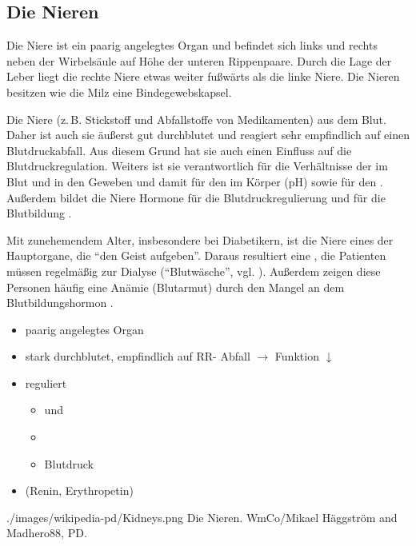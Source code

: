 \subsection{Die Nieren}


{%
Die Niere ist ein paarig angelegtes Organ und befindet sich
links und rechts neben der Wirbelsäule auf Höhe der unteren
Rippenpaare. Durch die Lage der Leber liegt die rechte Niere
etwas weiter fußwärts als die linke Niere. Die Nieren
besitzen wie die Milz eine Bindegewebskapsel.

Die Niere 
(z.\,B. Stickstoff und Abfallstoffe von Medikamenten) aus
dem Blut. Daher ist auch sie äußerst gut durchblutet und
reagiert sehr empfindlich auf einen Blutdruckabfall. Aus
diesem Grund hat sie auch einen Einfluss auf die
Blutdruckregulation.
Weiters ist sie verantwortlich für die Verhältnisse der
 im Blut und in den Geweben
und damit für den  im Körper (pH)
sowie für den .
Außerdem bildet die Niere Hormone für die
Blutdruckregulierung  und für die Blutbildung
.

Mit zunehemendem Alter, insbesondere bei Diabetikern, ist
die Niere eines der Hauptorgane, die \protect\enquote{den
Geist aufgeben}. Daraus resultiert eine , die Patienten müssen regelmäßig zur
Dialyse (\protect\enquote{Blutwäsche}, vgl.
).
Außerdem zeigen diese Personen häufig eine Anämie
(Blutarmut) durch den Mangel an dem Blutbildungshormon
.

}{
\begin{itemize}
  \item paarig angelegtes Organ
  \item stark durchblutet, empfindlich auf RR- Abfall ${\rightarrow}$
  Funktion ${\downarrow}$
  \item reguliert
  \begin{itemize}
    \item {} und
    \item {}
    \item Blutdruck
  \end{itemize}
  \item {} (Renin, Erythropetin)
\end{itemize}
}
{./images/wikipedia-pd/Kidneys.png}
{Die Nieren.}
{WmCo/Mikael Häggström and Madhero88, PD.}




